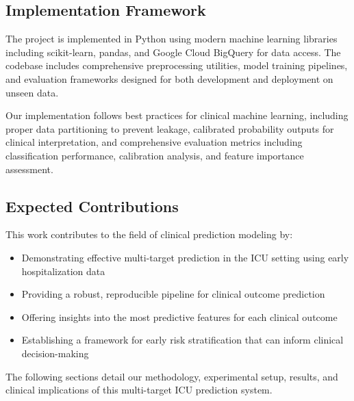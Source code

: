\documentclass[11pt]{article}
\begin{document}
\subsection{Implementation Framework}

The project is implemented in Python using modern machine learning libraries including scikit-learn, pandas, and Google Cloud BigQuery for data access. The codebase includes comprehensive preprocessing utilities, model training pipelines, and evaluation frameworks designed for both development and deployment on unseen data.

Our implementation follows best practices for clinical machine learning, including proper data partitioning to prevent leakage, calibrated probability outputs for clinical interpretation, and comprehensive evaluation metrics including classification performance, calibration analysis, and feature importance assessment.

\subsection{Expected Contributions}

This work contributes to the field of clinical prediction modeling by:
\begin{itemize}
    \item Demonstrating effective multi-target prediction in the ICU setting using early hospitalization data
    \item Providing a robust, reproducible pipeline for clinical outcome prediction
    \item Offering insights into the most predictive features for each clinical outcome
    \item Establishing a framework for early risk stratification that can inform clinical decision-making
\end{itemize}

The following sections detail our methodology, experimental setup, results, and clinical implications of this multi-target ICU prediction system.
\end{document}
